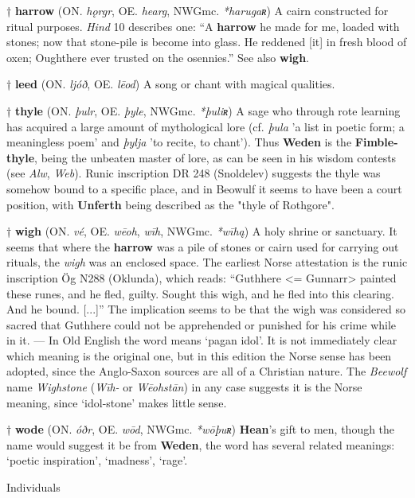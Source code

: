 † \textbf{harrow} (ON. \emph{hǫrgr}, OE. \emph{hearg}, NWGmc. \emph{*harugaʀ})
 A cairn constructed for ritual purposes. \emph{Hind} 10 describes one: “A \textbf{harrow} he made for me, loaded with stones; now that stone-pile is become into glass. He reddened [it] in fresh blood of oxen; Oughthere ever trusted on the osennies.” See also \textbf{wigh}.

† \textbf{leed} (ON. \emph{ljóð}, OE. \emph{lēod})
 A song or chant with magical qualities.

† \textbf{thyle} (ON. \emph{þulr}, OE. \emph{þyle}, NWGmc. \emph{*þuliʀ})
 A sage who through rote learning has acquired a large amount of mythological lore (cf. \emph{þula} 'a list in poetic form; a meaningless poem' and \emph{þylja} 'to recite, to chant'). Thus \textbf{Weden} is the \textbf{Fimble-thyle}, being the unbeaten master of lore, as can be seen in his wisdom contests (see \emph{Alw}, \emph{Web}). Runic inscription DR 248 (Snoldelev) suggests the thyle was somehow bound to a specific place, and in Beowulf it seems to have been a court position, with \textbf{Unferth} being described as the "thyle of Rothgore".

† \textbf{wigh} (ON. \emph{vé}, OE. \emph{wēoh}, \emph{wīh}, NWGmc. \emph{*wīhą})
 A holy shrine or sanctuary. It seems that where the \textbf{harrow} was a pile of stones or cairn used for carrying out rituals, the \emph{wigh} was an enclosed space. The earliest Norse attestation is the runic inscription Ög N288 (Oklunda), which reads: “Guthhere <= Gunnarr> painted these runes, and he fled, guilty. Sought this wigh, and he fled into this clearing. And he bound. [...]” The implication seems to be that the wigh was considered so sacred that Guthhere could not be apprehended or punished for his crime while in it. — In Old English the word means ‘pagan idol’. It is not immediately clear which meaning is the original one, but in this edition the Norse sense has been adopted, since the Anglo-Saxon sources are all of a Christian nature. The \emph{Beewolf} name \emph{Wighstone} (\emph{Wīh-} or \emph{Wēohstān}) in any case suggests it is the Norse meaning, since ‘idol-stone’ makes little sense.

† \textbf{wode} (ON. \emph{óðr}, OE. \emph{wōd}, NWGmc. \emph{*wōþuʀ})
 \textbf{Hean}'s gift to men, though the name would suggest it be from \textbf{Weden}, the word has several related meanings: ‘poetic inspiration’, ‘madness’, ‘rage’.



Individuals

